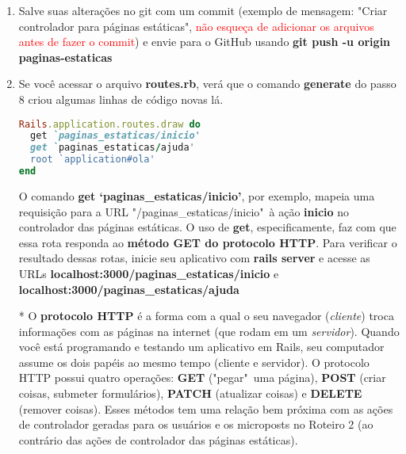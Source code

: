\documentclass[a4paper,12pt]{article}
\begin{document}
\begin{enumerate}
  \item Salve suas alterações no git com um commit (exemplo de mensagem: "Criar controlador para páginas estáticas", \textcolor{red}{não esqueça de adicionar os arquivos antes de fazer o commit}) e envie para o GitHub usando \textbf{git push -u origin paginas-estaticas}
  \item Se você acessar o arquivo \textbf{routes.rb}, verá que o comando \textbf{generate} do passo 8 criou algumas linhas de código novas lá.

  \begin{lstlisting}[language=Ruby, title=config/routes.rb]
Rails.application.routes.draw do
  get `paginas_estaticas/inicio'
  get `paginas_estaticas/ajuda'
  root `application#ola'
end
  \end{lstlisting}

  O comando \textbf{get `paginas\_estaticas/inicio'}, por exemplo, mapeia uma requisição para a URL "/paginas\_estaticas/inicio"\ à ação \textbf{inicio} no controlador das páginas estáticas. O uso de \textbf{get}, especificamente, faz com que essa rota responda ao \textbf{método GET do protocolo HTTP}. Para verificar o resultado dessas rotas, inicie seu aplicativo com \textbf{rails server} e acesse as URLs \textbf{localhost:3000/paginas\_estaticas/inicio} e \textbf{localhost:3000/paginas\_estaticas/ajuda}
  \item [*] O \textbf{protocolo HTTP} é a forma com a qual o seu navegador (\textit{cliente}) troca informações com as páginas na internet (que rodam em um \textit{servidor}). Quando você está programando e testando um aplicativo em Rails, seu computador assume os dois papéis ao mesmo tempo (cliente e servidor). O protocolo HTTP possui quatro operações: \textbf{GET} ("pegar"\ uma página), \textbf{POST} (criar coisas, submeter formulários), \textbf{PATCH} (atualizar coisas) e \textbf{DELETE} (remover coisas). Esses métodos tem uma relação bem próxima com as ações de controlador geradas para os usuários e os microposts no Roteiro 2 (ao contrário das ações de controlador das páginas estáticas).


\end{enumerate}
\end{document}
